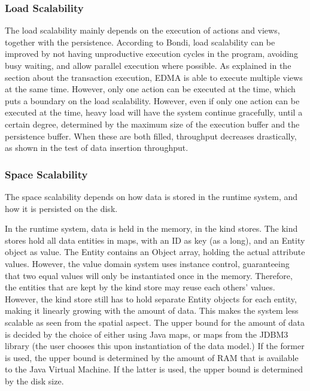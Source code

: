 \subsubsection{Load Scalability}

The load scalability mainly depends on the execution of actions and
views, together with the persistence. According to Bondi, load scalability
can be improved by not having unproductive execution cycles in the
program, avoiding busy waiting, and allow parallel execution where
possible. As explained in the section about the transaction execution,
EDMA is able to execute multiple views at the same time. However,
only one action can be executed at the time, which puts a boundary
on the load scalability. However, even if only one action can be executed
at the time, heavy load will have the system continue gracefully,
until a certain degree, determined by the maximum size of the execution
buffer and the persistence buffer. When these are both filled, throughput
decreases drastically, as shown in the test of data insertion throughput.


\subsubsection{Space Scalability}

The space scalability depends on how data is stored in the runtime
system, and how it is persisted on the disk.

In the runtime system, data is held in the memory, in the kind stores.
The kind stores hold all data entities in maps, with an ID as key
(as a long), and an Entity object as value. The Entity contains an
Object array, holding the actual attribute values. However, the value
domain system uses instance control, guaranteeing that two equal values
will only be instantiated once in the memory. Therefore, the entities
that are kept by the kind store may reuse each others' values. However,
the kind store still has to hold separate Entity objects for each
entity, making it linearly growing with the amount of data. This makes
the system less scalable as seen from the spatial aspect. The upper
bound for the amount of data is decided by the choice of either using
Java maps, or maps from the JDBM3 library (the user chooses this upon
instantiation of the data model.) If the former is used, the upper
bound is determined by the amount of RAM that is available to the
Java Virtual Machine. If the latter is used, the upper bound is determined
by the disk size.


